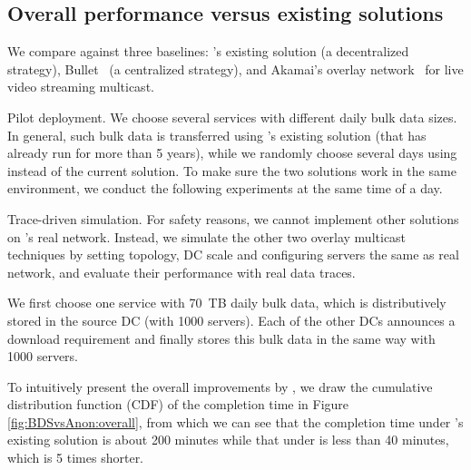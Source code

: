 \subsection{Overall performance versus existing solutions}
\label{subsec:evaluation:centralized}

We compare \name against three baselines:
\company's existing solution (a decentralized strategy),
Bullet~\cite{kostic2003bullet} (a centralized strategy), and
Akamai's overlay network~\cite{Andreev2013Designing} for live video streaming
multicast.


Pilot deployment. We choose several services with different daily bulk data sizes. In general, such bulk data is transferred using \company's existing solution (that has already run for more than 5 years), while we randomly choose several days using \name instead of the current solution. To make sure the two solutions work in the same environment, we conduct the following experiments at the same time of a day.

Trace-driven simulation. For safety reasons, we cannot implement other solutions on \company's real network. Instead, we simulate the other two overlay multicast techniques by setting topology, DC scale and configuring servers the same as real network, and evaluate their performance with real data traces.




We first choose one service with 70~TB daily bulk data, which is distributively stored in the source DC (with 1000 servers). Each of the other DCs announces a download requirement and finally stores this bulk data in the same way with 1000 servers.


To intuitively present the overall improvements by \name, we draw the cumulative distribution function (CDF) of the completion time in Figure \ref{fig:BDSvsAnon:overall}, from which we can see that the completion time under \company's existing solution is about 200 minutes while that under \name is less than 40 minutes, which is 5 times shorter.


